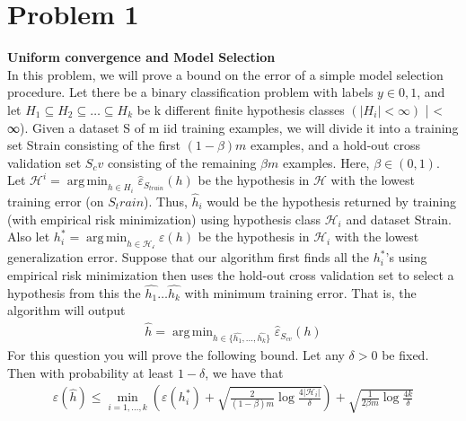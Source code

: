 \documentclass{article}
\title{Problem Set #3: Learning Theory and Unsupervised Learning}
\author{Eitan Joseph \and Caroline Wang}
\date{\today}
\DeclareMathOperator*{\argmin}{arg\,min}
\begin{document}
\maketitle

\section*{Problem 1}
\textbf{Uniform convergence and Model Selection}\\
In this problem, we will prove a bound on the error of a simple model selection procedure. Let there be a binary classification problem with labels $y \in {0, 1}$, and let $H_1\subseteq H_2\subseteq \dots \subseteq H_k$ be k different finite hypothesis classes $(|H_i|<\infty)$
| < ∞). Given a dataset S of m iid training examples, we will divide it into a training set Strain consisting of the first $(1-\beta)m$ examples, and a hold-out cross validation set $S_cv$ consisting of the remaining $\beta m$ examples. Here, $\beta \in (0,1)$. Let $\mathcal{H}^i = \argmin_{h\in H_i} \hat{\varepsilon}_S_{train} (h)$ be the hypothesis in $\mathcal{H}$ with the lowest training error
(on $S_train$). Thus, $\hat{h}_i$  would be the hypothesis returned by training (with empirical risk minimization) using hypothesis class $\mathcal{H}_i$ and dataset Strain. Also let $h^*_i=\argmin_{h\in \mathcal{H_i}}\varepsilon(h)$ be the hypothesis in $\mathcal{H}_i$ with the lowest generalization error. Suppose that our algorithm first finds all the $h^*_i$’s using empirical risk minimization then
uses the hold-out cross validation set to select a hypothesis from this the $\hat{h_1}\dots \hat{h_k}$ with minimum training error. That is, the algorithm will output
\begin{align*}
    \hat{h} = \argmin_{h \in \{\hat{h_1},...,\hat{h_k}\}}\hat{\varepsilon}_{S_{cv}}(h)
\end{align*}
For this question you will prove the following bound. Let any $\delta > 0$ be fixed. Then with probability at least $1 − \delta$, we have that
\begin{align*}
    \varepsilon(\hat{h}) \leq \min_{i=1,...,k} \left(\varepsilon(h_i^*)+\sqrt{\frac{2}{(1-\beta)m}\log\frac{4|\mathcal{H}_i|}{\delta}}\right) +  \sqrt{\frac{1}{2\beta m}\log \frac{4k}{\delta}}
\end{align*}
\end{document}
